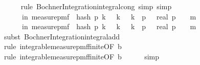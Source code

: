 \begin{isabellebody}
\ \ \ \ \isamarkupfalse%
\ {\isacharparenleft}{\kern0pt}rule\ Bochner{\isacharunderscore}{\kern0pt}Integration{\isachardot}{\kern0pt}integral{\isacharunderscore}{\kern0pt}cong{\isacharcomma}{\kern0pt}\ simp{\isacharcomma}{\kern0pt}\ simp{\isacharparenright}{\kern0pt}\isanewline
\ \ \isamarkupfalse%
\ \isamarkupfalse%
\ {\isachardoublequoteopen}{\isachardot}{\kern0pt}{\isachardot}{\kern0pt}{\isachardot}{\kern0pt}\ {\isacharequal}{\kern0pt}\ \isanewline
\ \ \ \ \ {\isasymP}{\isacharparenleft}{\kern0pt}{\isasymomega}\ in\ measure{\isacharunderscore}{\kern0pt}pmf\ {\isasymOmega}{\isachardot}{\kern0pt}\ hash\ p\ k\ {\isasymomega}\ {\isasymin}\ {\isacharbraceleft}{\kern0pt}k{\isachardot}{\kern0pt}\ {}\ {\isacharasterisk}{\kern0pt}\ k\ {\isacharless}{\kern0pt}\ p{\isacharbraceright}{\kern0pt}{\isacharparenright}{\kern0pt}\ \ {\isacharasterisk}{\kern0pt}\ {\isacharparenleft}{\kern0pt}real\ p\ {\isacharminus}{\kern0pt}\ {}{\isacharparenright}{\kern0pt}\ {\isacharcircum}{\kern0pt}\ m\ \ {\isacharplus}{\kern0pt}\ \isanewline
\ \ \ \ \ {\isasymP}{\isacharparenleft}{\kern0pt}{\isasymomega}\ in\ measure{\isacharunderscore}{\kern0pt}pmf\ {\isasymOmega}{\isachardot}{\kern0pt}\ hash\ p\ k\ {\isasymomega}\ {\isasymin}\ {\isacharbraceleft}{\kern0pt}k{\isachardot}{\kern0pt}\ {}\ {\isacharasterisk}{\kern0pt}\ k\ {\isasymge}\ p{\isacharbraceright}{\kern0pt}{\isacharparenright}{\kern0pt}\ \ {\isacharasterisk}{\kern0pt}\ {\isacharparenleft}{\kern0pt}{\isacharminus}{\kern0pt}real\ p\ {\isacharminus}{\kern0pt}\ {}{\isacharparenright}{\kern0pt}\ {\isacharcircum}{\kern0pt}\ m\ {\isachardoublequoteclose}\isanewline
\ \ \ \ \isamarkupfalse%
\ {\isacharparenleft}{\kern0pt}subst\ Bochner{\isacharunderscore}{\kern0pt}Integration{\isachardot}{\kern0pt}integral{\isacharunderscore}{\kern0pt}add{\isacharparenright}{\kern0pt}\isanewline
\ \ \ \ \isamarkupfalse%
\ {\isacharparenleft}{\kern0pt}rule\ integrable{\isacharunderscore}{\kern0pt}measure{\isacharunderscore}{\kern0pt}pmf{\isacharunderscore}{\kern0pt}finite{\isacharbrackleft}{\kern0pt}OF\ b{\isacharbrackright}{\kern0pt}{\isacharparenright}{\kern0pt}\isanewline
\ \ \ \ \isamarkupfalse%
\ {\isacharparenleft}{\kern0pt}rule\ integrable{\isacharunderscore}{\kern0pt}measure{\isacharunderscore}{\kern0pt}pmf{\isacharunderscore}{\kern0pt}finite{\isacharbrackleft}{\kern0pt}OF\ b{\isacharbrackright}{\kern0pt}{\isacharparenright}{\kern0pt}\isanewline
\ \ \ \ \isamarkupfalse%
\ simp\isanewline

\end{isabellebody}
